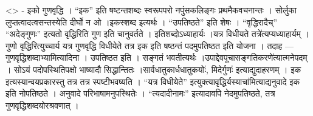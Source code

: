 \textless{}\textgreater{} - इको गुणवृद्धि । ``इक'' इति षष्टन्तशब्दः
स्वरूपपरो नपुंसकलिङ्गः प्रथमैकवचनान्तः । सोर्लुका
लुप्तत्वादत्वसन्तस्येति दीर्घो न ओ ।इकस्शब्द इत्यर्थः । ``उपतिष्ठते''
इति शेषः । ``वृद्धिरादैच्'' ``अदेङ्गुणः'' इत्यतो वृद्धिरिति गुण इति
चानुवर्तते । इतिशब्दोऽध्याहार्यः ।यत्र विधीयते तत्रे॑त्यप्यध्याहार्यम् ।
गुणो वृद्धिरित्युच्चार्य यत्र गुणवृद्धि विधीयेते तत्र इक इति षष्ठन्तं
पदमुपतिष्ठत इति योजना । तदाह --- गुणवृद्धिशब्दाभ्यामित्यादिना । उपतिष्ठत
इति । सङ्गतं भवतीत्यर्थः ।उपाद्देवपूचासङ्गतिकरणे॑त्यात्मनेपदम् । सोऽयं
पदोपस्थितिपक्षो भाष्यादौ सिद्धान्तितः ।सार्वधातुकार्धधातुकयोः॑,
मिदेर्गुणः॑ इत्याद्युदाहरणम् । इक इत्यस्यान्वयप्रकारस्तु तत्र तत्र
स्पष्टीभवष्यति । ``यत्र विधीयेते''
इत्युक्त्यावृद्धिर्यस्याचा॑मित्याद्यनुवादे इक इति नोपतिष्ठते । अनुवादे
परिभाषामनुपस्थितेः । ``त्यदादीनामः'' इत्यादावपि नेदमुपतिष्ठते, तत्र
गुणवृद्धिशब्दयोरश्रवणात् ।
